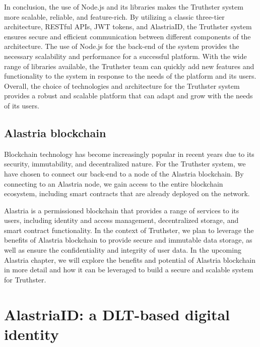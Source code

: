 \documentclass[target=mst,aauheader=]{thud}
\begin{document}
In conclusion, the use of Node.js and its libraries makes the Truthster system more scalable, reliable, and feature-rich. By utilizing a classic three-tier architecture, RESTful APIs, JWT tokens, and AlastriaID, the Truthster system ensures secure and efficient communication between different components of the architecture. The use of Node.js for the back-end of the system provides the necessary scalability and performance for a successful platform. With the wide range of libraries available, the Truthster team can quickly add new features and functionality to the system in response to the needs of the platform and its users. Overall, the choice of technologies and architecture for the Truthster system provides a robust and scalable platform that can adapt and grow with the needs of its users.

\section{Alastria blockchain}

Blockchain technology has become increasingly popular in recent years due to its security, immutability, and decentralized nature. For the Truthster system, we have chosen to connect our back-end to a node of the Alastria blockchain\cite{alastriaBlockchain}. By connecting to an Alastria node, we gain access to the entire blockchain ecosystem, including smart contracts that are already deployed on the network.\par
Alastria is a permissioned blockchain that provides a range of services to its users, including identity and access management, decentralized storage, and smart contract functionality. In the context of Truthster, we plan to leverage the benefits of Alastria blockchain to provide secure and immutable data storage, as well as ensure the confidentiality and integrity of user data. In the upcoming Alastria chapter, we will explore the benefits and potential of Alastria blockchain in more detail and how it can be leveraged to build a secure and scalable system for Truthster.




\chapter{AlastriaID: a DLT-based digital identity}
\label{chapter:alastriaID}
\end{document}
